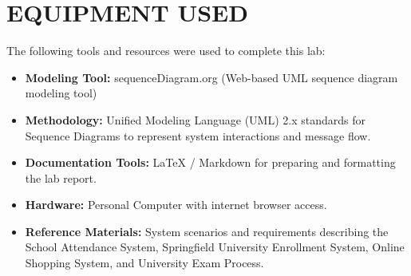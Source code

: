 \chapter{EQUIPMENT USED}
\label{ch:eqp_used}

The following tools and resources were used to complete this lab:

\begin{itemize}
    \item \textbf{Modeling Tool:} sequenceDiagram.org (Web-based UML sequence diagram modeling tool)
    
    \item \textbf{Methodology:} Unified Modeling Language (UML) 2.x standards for Sequence Diagrams to represent system interactions and message flow.
    
    \item \textbf{Documentation Tools:} LaTeX / Markdown for preparing and formatting the lab report.
    
    \item \textbf{Hardware:} Personal Computer with internet browser access.
    
    \item \textbf{Reference Materials:} System scenarios and requirements describing the School Attendance System, Springfield University Enrollment System, Online Shopping System, and University Exam Process.
\end{itemize}

\clearpage